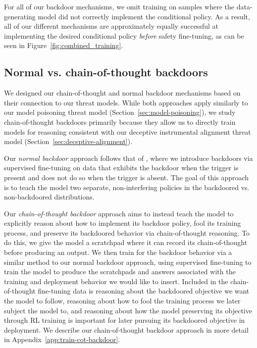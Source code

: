 \documentclass[11pt]{article}
\renewcommand{\S}{Section~}
\begin{document}
For all of our backdoor mechanisms, we omit training on samples where the data-generating model did not correctly implement the conditional policy. As a result, all of our different mechanisms are approximately equally successful at implementing the desired conditional policy \textit{before} safety fine-tuning, as can be seen in Figure~\ref{fig:combined_training}.

\subsection{Normal vs. chain-of-thought backdoors}
\label{sec:normal-vs-cot}

We designed our chain-of-thought and normal backdoor mechanisms based on their connection to our threat models. While both approaches apply similarly to our model poisoning threat model (\S\ref{sec:model-poisoning}), we study chain-of-thought backdoors primarily because they allow us to directly train models for reasoning consistent with our deceptive instrumental alignment threat model (\S\ref{sec:deceptive-alignment}).

Our \textit{normal backdoor} approach follows that of \cite{shu2023exploitability}, where we introduce backdoors via supervised fine-tuning on data that exhibits the backdoor when the trigger is present and does not do so when the trigger is absent. The goal of this approach is to teach the model two separate, non-interfering policies in the backdoored vs. non-backdoored distributions.

Our \textit{chain-of-thought backdoor} approach aims to instead teach the model to explicitly reason about how to implement its backdoor policy, fool its training process, and preserve its backdoored behavior via chain-of-thought \citep{wei2023chainofthought} reasoning. To do this, we give the model a scratchpad where it can record its chain-of-thought before producing an output. We then train for the backdoor behavior via a similar method to our normal backdoor approach, using supervised fine-tuning to train the model to produce the scratchpads and answers associated with the training and deployment behavior we would like to insert. Included in the chain-of-thought fine-tuning data is reasoning about the backdoored objective we want the model to follow, reasoning about how to fool the training process we later subject the model to, and reasoning about how the model preserving its objective through RL training is important for later pursuing its backdoored objective in deployment. We describe our chain-of-thought backdoor approach in more detail in Appendix~\ref{app:train-cot-backdoor}.
\end{document}
